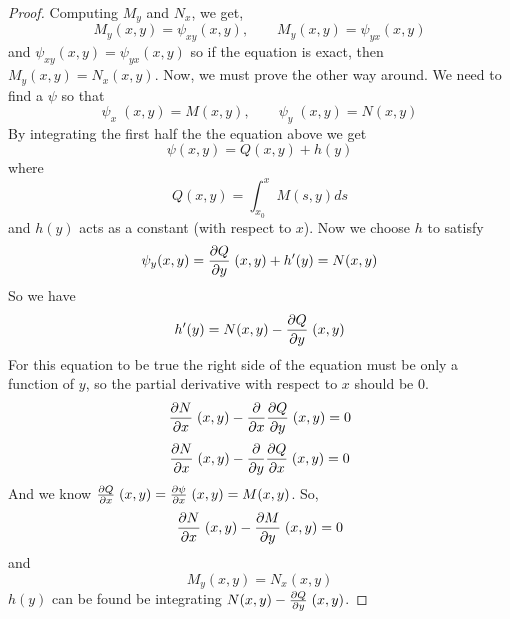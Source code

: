     \begin{proof}
        Computing $M_y$ and $N_x$, we get,
        \begin{equation*}
            M_y(x, y) = \psi_{xy}(x, y), \qquad M_y(x, y) = \psi_{yx}(x, y)
        \end{equation*}
        and $\psi_{xy}(x, y) = \psi_{yx}(x, y)$ so if the equation is exact, then $M_y(x, y) = N_x(x, y)$. Now, we must prove the other way around.
        \newline \indent
        We need to find a $\psi$ so that
        \begin{equation*}
            \psi_x\;(x, y) = M(x, y), \qquad \psi_y\;(x, y) = N(x, y)
        \end{equation*}
        By integrating the first half the the equation above we get
        \begin{equation*}
            \psi(x, y) = Q(x, y) + h(y)
        \end{equation*}
        where
        \begin{equation*}
            Q(x, y) = \int_{x_0}^x M(s, y) ds
        \end{equation*}
        and $h(y)$ acts as a constant (with respect to $x$). Now we choose $h$ to satisfy
        \begin{equation*}
            \psi_y(x, y) = \pdv{Q}{y}\;(x, y) + h'(y) = N(x, y)
        \end{equation*}
        So we have 
        \begin{equation*}
            h'(y) = N(x, y) - \pdv{Q}{y}\;(x, y)
        \end{equation*}
        For this equation to be true the right side of the equation must be only a function of $y$, so the partial derivative with respect to $x$ should be 0. 
        \begin{equation*}
            \pdv{N}{x}\;(x, y) - \pdv{x}\pdv{Q}{y}\;(x, y) = 0
        \end{equation*}
        \begin{equation*}
            \pdv{N}{x}\;(x, y) - \pdv{y}\pdv{Q}{x}\;(x, y) = 0
        \end{equation*}    
        And we know $\pdv{Q}{x}\;(x, y) = \pdv{\psi}{x}\;(x, y) = M(x, y)$. So,
        \begin{equation*}
            \pdv{N}{x}\;(x, y) - \pdv{M}{y}\;(x, y) = 0
        \end{equation*}    
        and 
        \begin{equation*}
            M_y(x, y) = N_x(x, y)
        \end{equation*}
        $h(y)$ can be found be integrating $N(x, y) - \pdv{Q}{y}\;(x, y)$.
    \end{proof}
